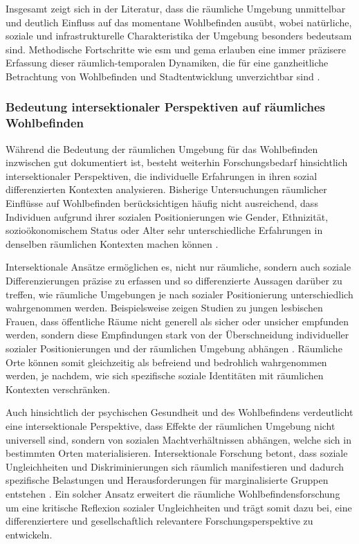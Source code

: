 Insgesamt zeigt sich in der Literatur, dass die räumliche Umgebung unmittelbar und deutlich Einfluss auf das momentane Wohlbefinden ausübt, wobei natürliche, soziale und infrastrukturelle Charakteristika der Umgebung besonders bedeutsam sind. Methodische Fortschritte wie \gls{esm} und \gls{gema} erlauben eine immer präzisere Erfassung dieser räumlich-temporalen Dynamiken, die für eine ganzheitliche Betrachtung von Wohlbefinden und Stadtentwicklung unverzichtbar sind \parencite{kirchnerSpatiotemporalDeterminantsMental2016, cookeMeasuringWellBeingReview2016}.

\subsubsection{Bedeutung intersektionaler Perspektiven auf räumliches Wohlbefinden}

Während die Bedeutung der räumlichen Umgebung für das Wohlbefinden inzwischen gut dokumentiert ist, besteht weiterhin Forschungsbedarf hinsichtlich intersektionaler Perspektiven, die individuelle Erfahrungen in ihren sozial differenzierten Kontexten analysieren. Bisherige Untersuchungen räumlicher Einflüsse auf Wohlbefinden berücksichtigen häufig nicht ausreichend, dass Individuen aufgrund ihrer sozialen Positionierungen wie Gender, Ethnizität, sozioökonomischem Status oder Alter sehr unterschiedliche Erfahrungen in denselben räumlichen Kontexten machen können \parencite{rodo-de-zarateDevelopingGeographiesIntersectionality2014, rodo-de-zarateIntersectionalityFeministGeographies2018}.

Intersektionale Ansätze ermöglichen es, nicht nur räumliche, sondern auch soziale Differenzierungen präzise zu erfassen und so differenzierte Aussagen darüber zu treffen, wie räumliche Umgebungen je nach sozialer Positionierung unterschiedlich wahrgenommen werden. Beispielsweise zeigen Studien zu jungen lesbischen Frauen, dass öffentliche Räume nicht generell als sicher oder unsicher empfunden werden, sondern diese Empfindungen stark von der Überschneidung individueller sozialer Positionierungen und der räumlichen Umgebung abhängen \parencite{rodo-de-zarateYoungLesbiansNegotiating2015}. Räumliche Orte können somit gleichzeitig als befreiend und bedrohlich wahrgenommen werden, je nachdem, wie sich spezifische soziale Identitäten mit räumlichen Kontexten verschränken.

Auch hinsichtlich der psychischen Gesundheit und des Wohlbefindens verdeutlicht eine intersektionale Perspektive, dass Effekte der räumlichen Umgebung nicht universell sind, sondern von sozialen Machtverhältnissen abhängen, welche sich in bestimmten Orten materialisieren. Intersektionale Forschung betont, dass soziale Ungleichheiten und Diskriminierungen sich räumlich manifestieren und dadurch spezifische Belastungen und Herausforderungen für marginalisierte Gruppen entstehen \parencite{websterCenteringSocialtechnicalRelations2021}. Ein solcher Ansatz erweitert die räumliche Wohlbefindensforschung um eine kritische Reflexion sozialer Ungleichheiten und trägt somit dazu bei, eine differenziertere und gesellschaftlich relevantere Forschungsperspektive zu entwickeln.

